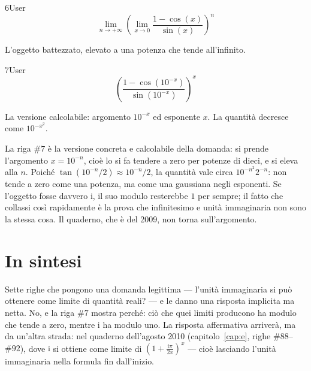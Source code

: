 \begin{espr}{6}{User}{}
\[
\lim_{n \to +\infty} \left(\lim_{x \to 0} \frac{1 - \cos\!\left(x\right)}{\sin\!\left(x\right)}\right)^{n}
\]
\end{espr}
L'oggetto battezzato, elevato a una potenza che tende all'infinito.

\begin{espr}{7}{User}{}
\[
\left(\frac{1 - \cos\!\left(10^{-x}\right)}{\sin\!\left(10^{-x}\right)}\right)^{x}
\]
\end{espr}
La versione calcolabile: argomento $10^{-x}$ ed esponente $x$. La quantità decresce come $10^{-x^2}$.


La riga $\#7$ è la versione concreta e calcolabile della domanda: si prende l'argomento $x=10^{-n}$, cioè lo si fa tendere a zero per potenze di dieci, e si eleva alla $n$. Poiché $\tan(10^{-n}/2)\approx 10^{-n}/2$, la quantità vale circa $10^{-n^2}2^{-n}$: non tende a zero come una potenza, ma come una gaussiana negli esponenti. Se l'oggetto fosse davvero $\mathrm{i}$, il suo modulo resterebbe $1$ per sempre; il fatto che collassi così rapidamente è la prova che infinitesimo e unità immaginaria non sono la stessa cosa. Il quaderno, che è del 2009, non torna sull'argomento.

\section*{In sintesi}

Sette righe che pongono una domanda legittima — l'unità immaginaria si può ottenere come limite di quantità reali? — e le danno una risposta implicita ma netta. No, e la riga $\#7$ mostra perché: ciò che quei limiti producono ha modulo che tende a zero, mentre $\mathrm{i}$ ha modulo uno. La risposta affermativa arriverà, ma da un'altra strada: nel quaderno  dell'agosto 2010 (capitolo~\ref{cap:e}, righe $\#88$--$\#92$), dove $\mathrm{i}$ si ottiene come limite di $\left(1+\tfrac{\mathrm{i}\pi}{2x}\right)^x$ — cioè lasciando l'unità immaginaria nella formula fin dall'inizio.

